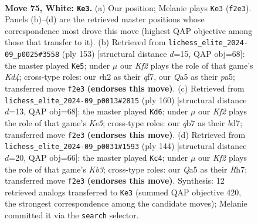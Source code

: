 \documentclass[11pt]{article}
\begin{document}
\clearpage

\begin{figure}[p]\centering
\begin{subfigure}{0.46\textwidth}\centering
\resizebox{\linewidth}{!}{%
\newchessgame
\chessboard[
  setfen={8/1q5k/5p2/Q7/8/6P1/5K1r/8 w - - 0 75},
  showmover=false,
  pgfstyle=straightmove, color=movearrow, markmove={f2-e3}
]}
\caption{}
\end{subfigure}\hfill
\begin{subfigure}{0.46\textwidth}\centering
\resizebox{\linewidth}{!}{%
\newchessgame
\chessboard[
  setfen={8/1K3Q2/8/PP1k4/4p3/4B3/8/8 b - - 12 77},
  showmover=false,
  pgfstyle=straightmove, color=movearrow, markmove={d5-e5}
]}
\caption{}
\end{subfigure}
\\[4pt]
\begin{subfigure}{0.46\textwidth}\centering
\resizebox{\linewidth}{!}{%
\newchessgame
\chessboard[
  setfen={6k1/3b4/8/4K1r1/3P4/5Q2/8/8 w - - 19 81},
  showmover=false,
  pgfstyle=straightmove, color=movearrow, markmove={e5-d6}
]}
\caption{}
\end{subfigure}\hfill
\begin{subfigure}{0.46\textwidth}\centering
\resizebox{\linewidth}{!}{%
\newchessgame
\chessboard[
  setfen={8/7R/8/2P5/8/1K1r1k2/7p/8 w - - 0 73},
  showmover=false,
  pgfstyle=straightmove, color=movearrow, markmove={b3-c4}
]}
\caption{}
\end{subfigure}
\caption{\textbf{Move 75, White: \texttt{Ke3}.} (a) Our position; Melanie plays \texttt{Ke3} (\texttt{f2e3}). Panels (b)--(d) are the retrieved master positions whose correspondence most drove this move (highest QAP objective among those that transfer to it). (b) Retrieved from \texttt{lichess\_elite\_2024-09\_p0025\#3558} (ply 153) [structural distance $d$=15, QAP obj=68]: the master played \texttt{Ke5}; under $\mu$ our \emph{Kf2} plays the role of that game's \emph{Kd4}; cross-type roles: our \emph{r}h2 as their \emph{q}f7, our \emph{Q}a5 as their \emph{p}a5; transferred move \texttt{f2e3} \textbf{(endorses this move)}. (c) Retrieved from \texttt{lichess\_elite\_2024-09\_p0013\#2815} (ply 160) [structural distance $d$=13, QAP obj=68]: the master played \texttt{Kd6}; under $\mu$ our \emph{Kf2} plays the role of that game's \emph{Ke5}; cross-type roles: our \emph{q}b7 as their \emph{b}d7; transferred move \texttt{f2e3} \textbf{(endorses this move)}. (d) Retrieved from \texttt{lichess\_elite\_2024-09\_p0031\#1593} (ply 144) [structural distance $d$=20, QAP obj=66]: the master played \texttt{Kc4}; under $\mu$ our \emph{Kf2} plays the role of that game's \emph{Kb3}; cross-type roles: our \emph{Q}a5 as their \emph{R}h7; transferred move \texttt{f2e3} \textbf{(endorses this move)}. Synthesis: 12 retrieved analogs transferred to \texttt{Ke3} (summed QAP objective 420, the strongest correspondence among the candidate moves); Melanie committed it via the \texttt{search} selector.}
\label{fig:thought-m148}
\end{figure}
\end{document}
